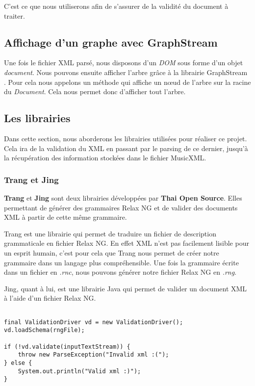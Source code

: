 \par
C'est ce que nous utiliserons afin de s'assurer de la validité du document à traiter.


\subsection{Affichage d'un graphe avec GraphStream}

Une fois le fichier XML parsé, nous disposons d'un \emph{DOM} sous forme d'un objet \emph{document}. Nous pouvons ensuite afficher l'arbre grâce à la librairie GraphStream \cite{graphstream}. Pour cela nous appelons un méthode qui affiche un nœud de l'arbre sur la racine du \emph{Document}. Cela nous permet donc d'afficher tout l'arbre.


\subsection{Les librairies}

Dans cette section, nous aborderons les librairies utilisées pour réaliser ce projet. Cela ira de la validation du XML en passant par le parsing de ce dernier, jusqu'à la récupération des information stockées dans le fichier MusicXML.


\subsubsection{Trang et Jing}

\textbf{Trang} \cite{trang} et \textbf{Jing} \cite{jing} sont deux librairies développées par \textbf{Thai Open Source}. Elles permettant de générer des grammaires Relax NG et de valider des documents XML à partir de cette même grammaire.

\par
Trang est une librairie qui permet de traduire un fichier de description grammaticale en fichier Relax NG. En effet XML n'est pas facilement lisible pour un esprit humain, c'est pour cela que Trang nous permet de créer notre grammaire dans un langage plus compréhensible. Une fois la grammaire écrite dans un fichier en \emph{.rnc}, nous pouvons générer notre fichier Relax NG en \emph{.rng}.

\par
Jing, quant à lui, est une librairie Java qui permet de valider un document XML à l'aide d'un fichier Relax NG.


\begin{lstlisting}[caption=Code java permettant de vérifier la validation d'un document XML]

final ValidationDriver vd = new ValidationDriver();
vd.loadSchema(rngFile);

if (!vd.validate(inputTextStream)) {
	throw new ParseException("Invalid xml :(");
} else {
    System.out.println("Valid xml :)");
}
\end{lstlisting}

